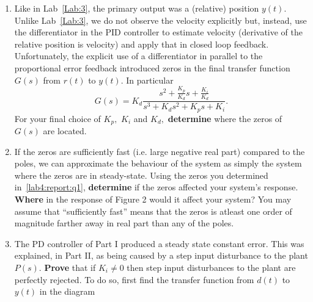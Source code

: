 \begin{deliverable}[label={lab4:report}]
  \begin{enumerate}[label={(\arabic*)}]
    \item{%
      Like in Lab~\ref{Lab:3}, the primary output was a (relative) position \(y(t).\)
      Unlike Lab~\ref{Lab:3}, we do not observe the velocity explicitly but, instead, use the differentiator in the PID controller to estimate velocity (derivative of the relative position is velocity) and apply that in closed loop feedback.
      Unfortunately, the explicit use of a differentiator in parallel to the proportional error feedback introduced zeros in the final transfer function \(G(s)\) from \(r(t)\) to \(y(t).\)
      In particular
      \[
        G(s) = K_d \frac{s^2 + \frac{K_p}{K_d} s + \frac{K_i}{K_d}}{s^3 + K_d s^2 + K_p s + K_i}.
      \]
      For your final choice of \(K_p,\) \(K_i\) and \(K_d,\) \textbf{determine} where the zeros of \(G(s)\) are located.
      \label{lab4:report:q1}
    }
    \item{%
      If the zeros are sufficiently fast (i.e. large negative real part) compared to the poles, we can approximate the behaviour of the system as simply the system where the zeros are in steady-state.
      Using the zeros you determined in~\ref{lab4:report:q1}, \textbf{determine} if the zeros affected your system's response.
      \textbf{Where} in the response of Figure 2 would it affect your system?
      You may assume that ``sufficiently fast'' means that the zeros is atleast one order of magnitude farther away in real part than any of the poles.
      \label{lab4:report:q2}
    }
    \item{%
      The PD controller of Part I produced a steady state constant error.
      This was explained, in Part II, as being caused by a step input disturbance to the plant \(P(s).\)
      \textbf{Prove} that if \(K_i \neq 0\) then step input disturbances to the plant are perfectly rejected.
      To do so, first find the transfer function from \(d(t)\) to \(y(t)\) in the diagram
      \begin{center}
\end{center}}
\end{enumerate}
\end{deliverable}
